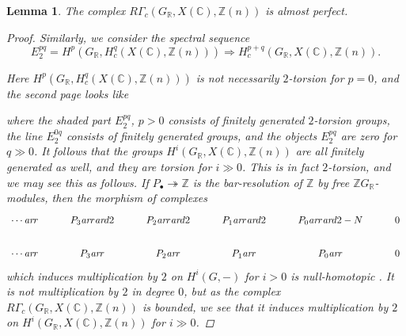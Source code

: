 \documentclass[leqno,12pt]{article}
\theoremstyle{plain}
\newtheorem{lemma}[theorem]{\indent\sc Lemma}
\theoremstyle{definition}
\newcommand{\ZZ}{\mathbb{Z}}
\newcommand{\RR}{\mathbb{R}}
\newcommand{\CC}{\mathbb{C}}
\newcommand{\ar}{\text{\it ar}}
\begin{document}
\begin{lemma}
  \label{lemma:RGammac(GR,X(C),Z(n))-almost-perfect}
  The complex $R\Gamma_c (G_\RR, X (\CC), \ZZ (n))$
  is almost perfect.

  \begin{proof}
    Similarly, we consider the spectral sequence
    \[ E_2^{pq} = H^p (G_\RR, H^q_c (X (\CC), \ZZ (n)))
    \Longrightarrow
    H^{p+q}_c (G_\RR, X (\CC), \ZZ (n)). \]

    Here $H^p (G_\RR, H^q_c (X (\CC), \ZZ (n)))$ is not necessarily $2$-torsion
    for $p = 0$, and the second page looks like
    \begin{center}
    \end{center}
    where the shaded part $E_2^{pq}$, $p > 0$ consists of finitely generated
    $2$-torsion groups, the line $E_2^{0q}$ consists of finitely generated
    groups, and the objects $E_2^{pq}$ are zero for $q \gg 0$. It follows that
    the groups $H^i (G_\RR, X (\CC), \ZZ (n))$ are all finitely generated as
    well, and they are torsion for $i \gg 0$. This is in fact $2$-torsion, and
    we may see this as follows. If $P_\bullet \twoheadrightarrow \ZZ$ is the
    bar-resolution of $\ZZ$ by free $\ZZ G_\RR$-modules, then the morphism of
    complexes
    \[ \begin{tikzcd}
      \cdots\ar{r} & P_3\ar{r}\ar{d}{2} & P_2\ar{r}\ar{d}{2} & P_1\ar{r}\ar{d}{2} & P_0\ar{r}\ar{d}{2-N} & 0 \\
      \cdots\ar{r} & P_3\ar{r} & P_2\ar{r} & P_1\ar{r} & P_0\ar{r} & 0
    \end{tikzcd} \]
    which induces multiplication by $2$ on $H^i (G,-)$ for $i > 0$
    is null-homotopic \cite[Theorem 6.5.8]{Weibel-1994}. It is not
    multiplication by $2$ in degree $0$, but as the complex
    $R\Gamma_c (G_\RR, X (\CC), \ZZ (n))$ is bounded, we see that it induces
    multiplication by $2$ on $H^i (G_\RR, X (\CC), \ZZ (n))$ for $i \gg 0$.
  \end{proof}
\end{lemma}
\end{document}
